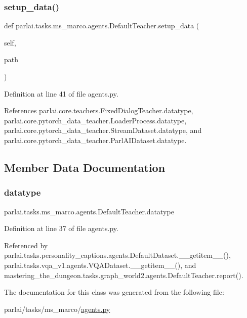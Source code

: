 \subsubsection{\texorpdfstring{setup\+\_\+data()}{setup\_data()}}
{\footnotesize\ttfamily def parlai.\+tasks.\+ms\+\_\+marco.\+agents.\+Default\+Teacher.\+setup\+\_\+data (\begin{DoxyParamCaption}\item[{}]{self,  }\item[{}]{path }\end{DoxyParamCaption})}



Definition at line 41 of file agents.\+py.



References parlai.\+core.\+teachers.\+Fixed\+Dialog\+Teacher.\+datatype, parlai.\+core.\+pytorch\+\_\+data\+\_\+teacher.\+Loader\+Process.\+datatype, parlai.\+core.\+pytorch\+\_\+data\+\_\+teacher.\+Stream\+Dataset.\+datatype, and parlai.\+core.\+pytorch\+\_\+data\+\_\+teacher.\+Parl\+A\+I\+Dataset.\+datatype.



\subsection{Member Data Documentation}
\mbox{\label{classparlai_1_1tasks_1_1ms__marco_1_1agents_1_1DefaultTeacher_abcedf76bc126510edfe336ab60b76a58}} 
\subsubsection{\texorpdfstring{datatype}{datatype}}
{\footnotesize\ttfamily parlai.\+tasks.\+ms\+\_\+marco.\+agents.\+Default\+Teacher.\+datatype}



Definition at line 37 of file agents.\+py.



Referenced by parlai.\+tasks.\+personality\+\_\+captions.\+agents.\+Default\+Dataset.\+\_\+\+\_\+getitem\+\_\+\+\_\+(), parlai.\+tasks.\+vqa\+\_\+v1.\+agents.\+V\+Q\+A\+Dataset.\+\_\+\+\_\+getitem\+\_\+\+\_\+(), and mastering\+\_\+the\+\_\+dungeon.\+tasks.\+graph\+\_\+world2.\+agents.\+Default\+Teacher.\+report().



The documentation for this class was generated from the following file\+:\begin{DoxyCompactItemize}
\item 
parlai/tasks/ms\+\_\+marco/\hyperlink{parlai_2tasks_2ms__marco_2agents_8py}{agents.\+py}\end{DoxyCompactItemize}
